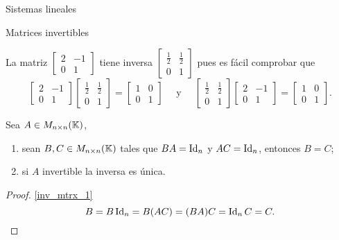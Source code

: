 \begin{chapter}{Sistemas lineales}
\begin{section}{Matrices invertibles}
            \begin{ejemplo*}
                La matriz $\begin{bmatrix} 2&-1\\0&1\end{bmatrix}$ tiene inversa 
                $\begin{bmatrix} \frac12&\frac12\\0&1\end{bmatrix}$ pues es fácil comprobar que 
                \begin{equation*}
                \begin{bmatrix} 2&-1\\0&1\end{bmatrix}
                \begin{bmatrix} \frac12&\frac12\\0&1\end{bmatrix} =
                \begin{bmatrix} 1&0\\0&1\end{bmatrix}\quad\text{ y } \quad
                \begin{bmatrix} \frac12&\frac12\\0&1\end{bmatrix} 
                \begin{bmatrix} 2&-1\\0&1\end{bmatrix}=
                \begin{bmatrix} 1&0\\0&1\end{bmatrix}.
                \end{equation*}
            \end{ejemplo*}
 
            \begin{proposicion}
                Sea $A  \in M_{n\times n}(\mathbb K)$, 
                \begin{enumerate}
                    \item\label{inv_mtrx_1}	sean $B, C \in M_{n \times n}(\mathbb K)$ tales que $BA =\operatorname{Id}_n$ y $AC = \operatorname{Id}_n$, entonces $B=C$;
                    \item\label{inv_mtrx_2}  si $A$ invertible la inversa es única.
                \end{enumerate}
            \end{proposicion}
            \begin{proof} \ref{inv_mtrx_1}
                \begin{equation*}
                B = B\operatorname{Id}_n = B(AC) = (BA)C = \operatorname{Id}_nC = C.
                \end{equation*}
                

\end{proof}
\end{section}
\end{chapter}
